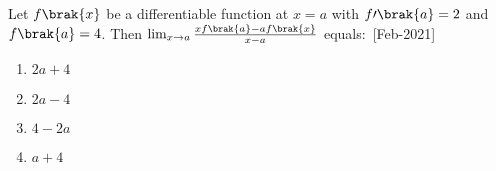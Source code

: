     \item Let $f\brak{x}$ be a differentiable function at $x=a$ with $f\prime\brak{a}=2$ and $f\brak{a}=4$. Then $\lim_{x \to a}\frac{xf\brak{a}-af\brak{x}}{x-a}$ equals$\colon$
    \hfill{[Feb-2021]}
        \begin{enumerate}
            \item $2a+4$
            \item $2a-4$
            \item $4-2a$
            \item $a+4$
        \end{enumerate}
